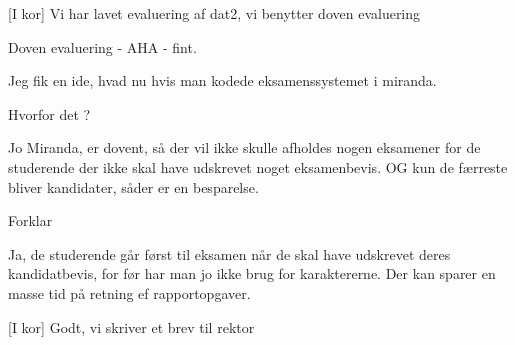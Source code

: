 \documentclass[a4paper,11pt]{article}
\begin{document}
\begin{sketch}
[I kor] Vi har lavet evaluering af dat2, vi
benytter doven evaluering 

 Doven evaluering - AHA - fint.

 Jeg fik en ide, hvad nu hvis man kodede
eksamenssystemet i miranda. 

 Hvorfor det ?

 Jo Miranda, er dovent, så der vil ikke skulle afholdes
nogen eksamener for de studerende der ikke skal have udskrevet noget
eksamenbevis. OG kun de færreste bliver kandidater, såder er en besparelse.

 Forklar 

 Ja, de studerende går først til eksamen når de skal
have udskrevet deres kandidatbevis, for før har man jo ikke brug for
karaktererne. Der kan sparer en masse tid på retning ef
rapportopgaver.  

[I kor] Godt, vi skriver et brev til rektor

\end{sketch}
\end{document}
